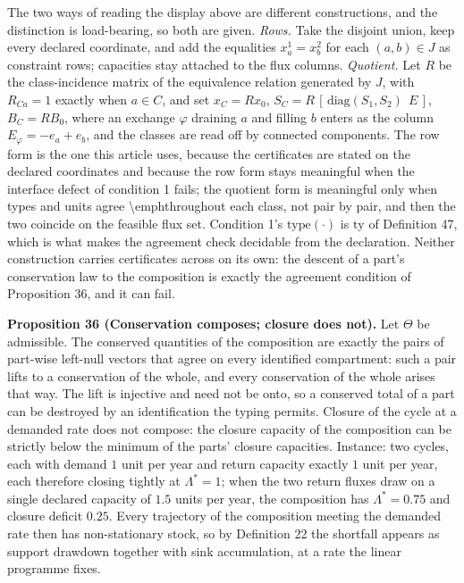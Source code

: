 \documentclass[11pt]{article}
\begin{document}
The two ways of reading the display above are different constructions, and the distinction is load-bearing, so both are given. \emph{Rows.} Take the disjoint union, keep every declared coordinate, and add the equalities \(x_a^1 = x_b^2\) for each \((a,b) \in J\) as constraint rows; capacities stay attached to the flux columns. \emph{Quotient.} Let \(R\) be the class-incidence matrix of the equivalence relation generated by \(J\), with \(R_{Ca} = 1\) exactly when \(a \in C\), and set \(x_C = R x_0\), \(S_C =\allowbreak{} R\,\allowbreak{}[\,\allowbreak{}\mathrm{diag}(S_1,\allowbreak{} S_2)\ \ E\,\allowbreak{}]\), \(B_C = R B_0\), where an exchange \(\varphi\) draining \(a\) and filling \(b\) enters as the column \(E_\varphi = -e_a + e_b\), and the classes are read off by connected components. The row form is the one this article uses, because the certificates are stated on the declared coordinates and because the row form stays meaningful when the interface defect of condition 1 fails; the quotient form is meaningful only when types and units agree \textbackslash{}emph{throughout} each class, not pair by pair, and then the two coincide on the feasible flux set. Condition 1's \(\mathrm{type}(\cdot)\) is \(\mathrm{ty}\) of Definition 47, which is what makes the agreement check decidable from the declaration. Neither construction carries certificates across on its own: the descent of a part's conservation law to the composition is exactly the agreement condition of Proposition 36, and it can fail.

\textbf{Proposition 36 (Conservation composes; closure does not).} Let \(\Theta\) be admissible. The conserved quantities of the composition are exactly the pairs of part-wise left-null vectors that agree on every identified compartment: such a pair lifts to a conservation of the whole, and every conservation of the whole arises that way. The lift is injective and need not be onto, so a conserved total of a part can be destroyed by an identification the typing permits. Closure of the cycle at a demanded rate does not compose: the closure capacity of the composition can be strictly below the minimum of the parts' closure capacities. Instance: two cycles, each with demand \(1\) unit per year and return capacity exactly \(1\) unit per year, each therefore closing tightly at \(\Lambda^{*} = 1\); when the two return fluxes draw on a single declared capacity of \(1.5\) units per year, the composition has \(\Lambda^{*} = 0.75\) and closure deficit \(0.25\). Every trajectory of the composition meeting the demanded rate then has non-stationary stock, so by Definition 22 the shortfall appears as support drawdown together with sink accumulation, at a rate the linear programme fixes.
\end{document}
